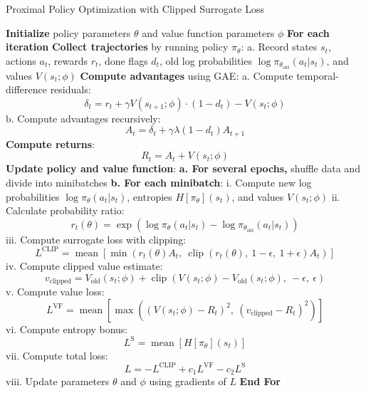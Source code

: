 \documentclass[a4paper,11pt]{article}
\begin{document}
 
\begin{algorithm}
    \caption{Proximal Policy Optimization with Clipped Surrogate Loss}
    \begin{algorithmic}[1]
        \State \textbf{Initialize} policy parameters $\theta$ and value function parameters $\phi$
        \Statex \textbf{For each iteration}
        \State \quad \textbf{Collect trajectories} by running policy $\pi_\theta$:
        \Statex \quad \quad a. Record states $s_t$, actions $a_t$, rewards $r_t$, done flags $d_t$, 
        \Statex \quad \quad \quad old log probabilities $\log \pi_{\theta_{\text{old}}}(a_t | s_t)$, and values $V(s_t; \phi)$
        \State \quad \textbf{Compute advantages} using GAE:
        \Statex \quad \quad a. Compute temporal-difference residuals:
        \Statex \quad \quad \quad $$\delta_t = r_t + \gamma V(s_{t+1}; \phi) \cdot (1 - d_t) - V(s_t; \phi)$$
        \Statex \quad \quad b. Compute advantages recursively:
        \Statex \quad \quad \quad $$A_t = \delta_t + \gamma \lambda (1 - d_t) A_{t+1}$$
        \State \quad \textbf{Compute returns}:
        \Statex \quad \quad $$R_t = A_t + V(s_t; \phi)$$
        \State \quad \textbf{Update policy and value function}:
        \Statex \quad \quad \textbf{a. For several epochs,} shuffle data and divide into minibatches
        \Statex \quad \quad \textbf{b. For each minibatch}:
        \Statex \quad \quad \quad i. Compute new log probabilities $\log \pi_\theta(a_t | s_t)$, 
        \Statex \quad \quad \quad \quad entropies $H[\pi_\theta](s_t)$, and values $V(s_t; \phi)$
        \Statex \quad \quad \quad ii. Calculate probability ratio:
        \Statex \quad \quad \quad \quad $$r_t(\theta) = \exp\left( \log \pi_\theta(a_t | s_t) - \log \pi_{\theta_{\text{old}}}(a_t | s_t) \right)$$
        \Statex \quad \quad \quad iii. Compute surrogate loss with clipping:
        \Statex \quad \quad \quad \quad $$L^{\text{CLIP}} = \operatorname{mean} \left[ \min \left( r_t(\theta) A_t,\ \operatorname{clip}\left( r_t(\theta),\ 1 - \epsilon,\ 1 + \epsilon \right) A_t \right) \right]$$
        \Statex \quad \quad \quad iv. Compute clipped value estimate:
        \Statex \quad \quad \quad \quad $$v_{\text{clipped}} = V_{\text{old}}(s_t; \phi) + \operatorname{clip}\left( V(s_t; \phi) - V_{\text{old}}(s_t; \phi),\ -\epsilon,\ \epsilon \right)$$
        \Statex \quad \quad \quad v. Compute value loss:
        \Statex \quad \quad \quad \quad $$L^{\text{VF}} = \operatorname{mean} \left[ \max \left( (V(s_t; \phi) - R_t)^2,\ (v_{\text{clipped}} - R_t)^2 \right) \right]$$
        \Statex \quad \quad \quad vi. Compute entropy bonus:
        \Statex \quad \quad \quad \quad $$L^{\text{S}} = \operatorname{mean} \left[ H[\pi_\theta](s_t) \right]$$
        \Statex \quad \quad \quad vii. Compute total loss:
        \Statex \quad \quad \quad \quad $$L = -L^{\text{CLIP}} + c_1 L^{\text{VF}} - c_2 L^{\text{S}}$$
        \Statex \quad \quad \quad viii. Update parameters $\theta$ and $\phi$ using gradients of $L$
        \Statex \textbf{End For}
    \end{algorithmic}
\end{algorithm}
\end{document}
